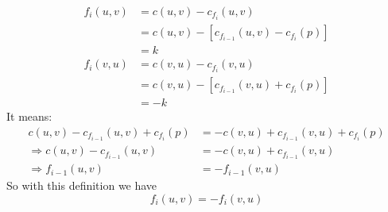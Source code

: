 \documentclass{book}
\begin{document}
	\begin{equation*}
		\begin{split}
		f_i(u, v) &= c(u, v) - c_{f_i}(u, v) \\
		&= c(u, v) - [c_{f_{i - 1}}(u, v) - c_{f_i}(p)] \\
		&= k
		\end{split}	
	\end{equation*}
	\begin{equation*}
		\begin{split}
		f_i(v, u) &= c(v, u) - c_{f_i}(v, u) \\
		&= c(v, u) - [c_{f_{i - 1}}(v, u) + c_{f_i}(p)] \\
		&= -k
		\end{split}
	\end{equation*}
	It means:
	\begin{equation*}
		\begin{split}
		c(u, v) - c_{f_{i - 1}}(u, v) + c_{f_i}(p) &= -c(v, u) + c_{f_{i - 1}}(v, u) + c_{f_i}(p)\\
		\Rightarrow c(u, v) - c_{f_{i - 1}}(u, v) &= -c(v, u) + c_{f_{i - 1}}(v, u) \\
		\Rightarrow f_{i - 1}(u, v) &= -f_{i - 1}(v, u)
		\end{split}
	\end{equation*}
	So with this definition we have
	\begin{equation}
		f_i(u, v) = -f_i(v, u)
	\end{equation}
\end{document}
